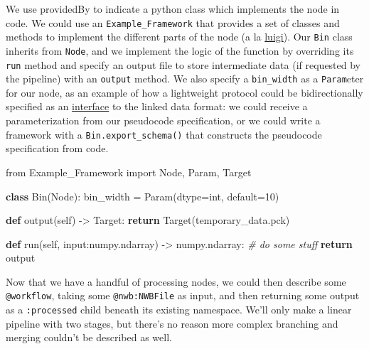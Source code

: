 \documentclass[10pt]{article}
\newenvironment{Shaded}{}{}
\newcommand{\BuiltInTok}[1]{#1}
\newcommand{\CommentTok}[1]{\textcolor[rgb]{0.38,0.63,0.69}{\textit{#1}}}
\newcommand{\ControlFlowTok}[1]{\textcolor[rgb]{0.00,0.44,0.13}{\textbf{#1}}}
\newcommand{\DecValTok}[1]{\textcolor[rgb]{0.25,0.63,0.44}{#1}}
\newcommand{\ImportTok}[1]{#1}
\newcommand{\KeywordTok}[1]{\textcolor[rgb]{0.00,0.44,0.13}{\textbf{#1}}}
\newcommand{\NormalTok}[1]{#1}
\newcommand{\OperatorTok}[1]{\textcolor[rgb]{0.40,0.40,0.40}{#1}}
\newcommand{\StringTok}[1]{\textcolor[rgb]{0.25,0.44,0.63}{#1}}
\newcommand{\VariableTok}[1]{\textcolor[rgb]{0.10,0.09,0.49}{#1}}
\begin{document}
\begin{multicols}{2}
We use providedBy to indicate a python class which implements the node
in code. We could use an \texttt{Example\_Framework} that provides a set
of classes and methods to implement the different parts of the node (a
la \href{https://luigi.readthedocs.io/en/stable/tasks.html}{luigi}). Our
\texttt{Bin} class inherits from \texttt{Node}, and we implement the
logic of the function by overriding its \texttt{run} method and specify
an output file to store intermediate data (if requested by the pipeline)
with an \texttt{output} method. We also specify a \texttt{bin\_width} as
a \texttt{Param}eter for our node, as an example of how a lightweight
protocol could be bidirectionally specified as an
\protect\hyperlink{shared-knowledge}{interface} to the linked data
format: we could receive a parameterization from our pseudocode
specification, or we could write a framework with a
\texttt{Bin.export\_schema()} that constructs the pseudocode
specification from code.

\begin{Shaded}
\begin{Highlighting}[]
\ImportTok{from}\NormalTok{ Example\_Framework }\ImportTok{import}\NormalTok{ Node, Param, Target}

\KeywordTok{class}\NormalTok{ Bin(Node):}
\NormalTok{  bin\_width }\OperatorTok{=}\NormalTok{ Param(dtype}\OperatorTok{=}\BuiltInTok{int}\NormalTok{, default}\OperatorTok{=}\DecValTok{10}\NormalTok{)}

  \KeywordTok{def}\NormalTok{ output(}\VariableTok{self}\NormalTok{) }\OperatorTok{{-}\textgreater{}}\NormalTok{ Target:}
    \ControlFlowTok{return}\NormalTok{ Target(}\StringTok{\textquotesingle{}temporary\_data.pck\textquotesingle{}}\NormalTok{)}

  \KeywordTok{def}\NormalTok{ run(}\VariableTok{self}\NormalTok{, }\BuiltInTok{input}\NormalTok{:}\StringTok{\textquotesingle{}numpy.ndarray\textquotesingle{}}\NormalTok{) }\OperatorTok{{-}\textgreater{}} \StringTok{\textquotesingle{}numpy.ndarray\textquotesingle{}}\NormalTok{:}
    \CommentTok{\# do some stuff}
    \ControlFlowTok{return}\NormalTok{ output}
\end{Highlighting}
\end{Shaded}

Now that we have a handful of processing nodes, we could then describe
some \texttt{@workflow}, taking some \texttt{@nwb:NWBFile} as input, and
then returning some output as a \texttt{:processed} child beneath its
existing namespace. We'll only make a linear pipeline with two stages,
but there's no reason more complex branching and merging couldn't be
described as well.


\end{multicols}
\end{document}
